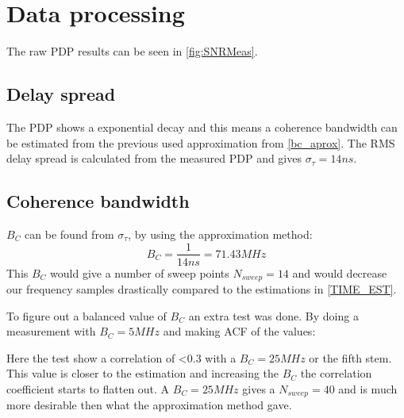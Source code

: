 \section{Data processing}
The raw PDP results can be seen in  \autoref{fig:SNRMeas}.
\subsection{Delay spread}
The PDP shows a exponential decay and this means a coherence bandwidth can be estimated from the previous used approximation from \autoref{bc_aprox}. The RMS delay spread is calculated from the measured PDP and gives $\sigma_{\tau} = 14ns$.

\subsection{Coherence bandwidth}\label{sec:coherence_bandwidth}

$B_C$ can be found from $\sigma_{\tau}$, by using the approximation method:
\begin{equation}
B_C = \frac{1}{14ns} = 71.43 MHz 
\end{equation}
This $B_C$ would give a number of sweep points $N_{sweep} = 14$ and would decrease our  frequency samples drastically compared to the estimations in \autoref{TIME_EST}.

To figure out a balanced value of $B_C$ an extra test was done. By doing a measurement with $B_C = 5MHz$ and making \gls{ACF} of the values:


Here the test show a correlation of <0.3 with a $B_C = 25MHz$ or the fifth stem. This value is closer to the estimation and increasing the $B_C$ the correlation coefficient starts to flatten out. A $B_C = 25MHz$ gives a $N_{sweep} = 40$ and is much more desirable then what the approximation method gave.

